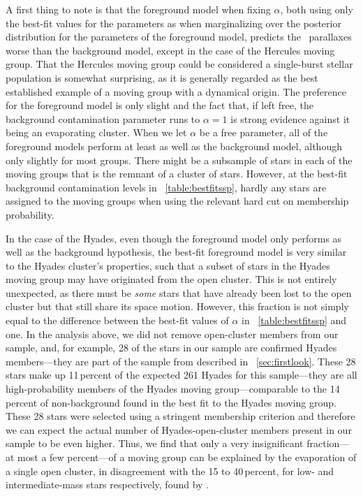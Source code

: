 A first thing to note is that the foreground model when fixing
$\alpha$, both using only the best-fit values for the parameters as
when marginalizing over the posterior distribution for the parameters
of the foreground model, predicts the \gcsabb\ parallaxes worse than
the background model, except in the case of the Hercules moving
group. That the Hercules moving group could be considered a
single-burst stellar population is somewhat surprising, as it is
generally regarded as the best established example of a moving group
with a dynamical origin. The preference for the foreground model is
only slight and the fact that, if left free, the background
contamination parameter runs to $\alpha = 1$ is strong evidence
against it being an evaporating cluster. When we let $\alpha$ be a
free parameter, all of the foreground models perform at least as well
as the background model, although only slightly for most groups. There
might be a subsample of stars in each of the moving groups that is the
remnant of a cluster of stars. However, at the best-fit background
contamination levels in \tablename~\ref{table:bestfitssp}, hardly any
stars are assigned to the moving groups when using the relevant hard
cut on membership probability.

In the case of the Hyades, even though the foreground model only
performs as well as the background hypothesis, the best-fit foreground
model is very similar to the Hyades cluster's properties, such that a
subset of stars in the Hyades moving group may have originated from
the open cluster. This is not entirely unexpected, as there must be
\emph{some} stars that have already been lost to the open cluster but
that still share its space motion. However, this fraction is not
simply equal to the difference between the best-fit values of $\alpha$
in \tablename~\ref{table:bestfitssp} and one. In the analysis above,
we did not remove open-cluster members from our sample, and, for
example, 28 of the stars in our sample are confirmed Hyades
members---they are part of the sample from \citet{Perryman98a}
described in \sectionname~\ref{sec:firstlook}. These 28 stars make up
11\,percent of the expected 261 Hyades for this sample---they are all
high-probability members of the Hyades moving group---comparable to
the 14\,percent of non-background found in the best fit to the Hyades
moving group. These 28 stars were selected using a stringent
membership criterion and therefore we can expect the actual number of
Hyades-open-cluster members present in our sample to be even
higher. Thus, we find that only a very insignificant fraction---at
most a few percent---of a moving group can be explained by the
evaporation of a single open cluster, in disagreement with the 15 to
40\,percent, for low- and intermediate-mass stars respectively, found
by \citet{Famaey07a}.


